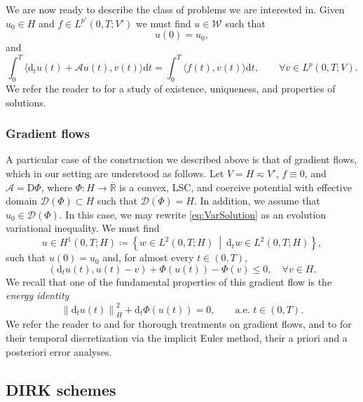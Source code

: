\documentclass{amsart}
\newcommand{\Real}{\mathbb{R}}
\newcommand{\mclA}{\mathcal{A}}
\newcommand{\mclW}{\mathcal{W}}
\newcommand{\mclD}{\mathcal{D}}
\theoremstyle{definition}
\newcommand{\diff}{\mathrm{d}}
\newcommand{\Diff}{\mathrm{D}}
\newcommand{\AJS}[1]{#1}
\begin{document}
We are now ready to describe the class of problems we are interested in. Given $u_0 \in H$ and $f \in L^{p'}(0,T;V')$ we must find $u \in \mclW$ such that
\[
  u(0) = u_0,
\]
and
\begin{equation}
\label{eq:VarSolution}
  \int_0^T \langle \diff_t u(t) + \mclA u(t), v(t) \rangle \diff t = \int_0^T \langle f(t), v(t) \rangle \diff t, \qquad \forall v \in L^p(0,T;V).
\end{equation}
We refer the reader to \cite[Part II]{MR3014456} for a study of existence, uniqueness, and properties of solutions.

\AJS{
\subsubsection{Gradient flows}
A particular case of the construction we described above is that of gradient flows, which in our setting are understood as follows. Let $V = H \eqsim V'$, $f \equiv 0$, and $\mclA = \Diff \Phi$, where $\Phi : H \to \overline{\Real}$ is a convex, LSC, and coercive potential with effective domain $\mclD(\Phi) \subset H$ such that $\overline{\mclD(\Phi)}  = H$. In addition, we assume that $u_0 \in \mclD(\Phi)$. In this case, we may rewrite \eqref{eq:VarSolution} as an evolution variational inequality. We must find
\[
  u \in H^1(0,T;H) \coloneqq \left\{ w \in L^2(0,T; H) \ \middle| \ \diff_t w \in L^2(0,T;H) \right\},
\]
such that $u(0)= u_0$ and, for almost every $t \in (0,T)$,
\begin{equation}
\label{eq:EVI}
  \left( \diff_t u(t), u(t) - v \right) + \Phi(u(t)) - \Phi(v) \leq 0, \quad \forall v \in H. %
\end{equation}
We recall that one of the fundamental properties of this gradient flow is the \emph{energy identity}
\begin{equation}
\label{eq:EnergyDissipation}
  \left\| \diff_t u(t) \right\|_H^2 + \diff_t \Phi(u(t)) =0, \qquad \text{a.e. } t \in (0,T).
\end{equation}
We refer the reader to \cite{MR348562} and \cite[Lecture 12]{MR4886890} for thorough treatments on gradient flows, and to \cite{MR1737503,MR1377244} for their temporal discretization via the implicit Euler method, their a priori and a posteriori error analyses.}

\subsection{DIRK schemes}
\label{sub:DIRK}
\end{document}
